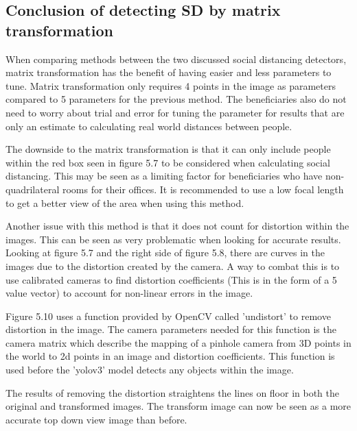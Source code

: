 \documentclass[12pt]{report}
\begin{document}
\subsection{Conclusion of detecting SD by matrix transformation}

When comparing methods between the two discussed social distancing detectors, matrix transformation has the benefit of having easier and less parameters to tune. Matrix transformation only requires 4 points in the image as parameters compared to 5 parameters for the previous method. The beneficiaries also do not need to worry about trial and error for tuning the parameter for results that are only an estimate to calculating real world distances between people.

\vspace{2mm}

The downside to the matrix transformation is that it can only include people within the red box seen in figure 5.7 to be considered when calculating social distancing. This may be seen as a limiting factor for beneficiaries who have non-quadrilateral rooms for their offices. It is recommended to use a low focal length to get a better view of the area when using this method.

\vspace{2mm}

Another issue with this method is that it does not count for distortion within the images. This can be seen as very problematic when looking for accurate results. Looking at figure 5.7 and the right side of figure 5.8, there are curves in the images due to the distortion created by the camera. A way to combat this is to use calibrated cameras to find distortion coefficients (This is in the form of a 5 value vector) to account for non-linear errors in the image.

\vspace{2mm}

Figure 5.10 uses a function provided by OpenCV called 'undistort' to remove distortion in the image. The camera parameters needed for this function is the camera matrix which describe the mapping of a pinhole camera from 3D points in the world to 2d points in an image and distortion coefficients. This function is used before the 'yolov3' model detects any objects within the image.

\vspace{2mm}

The results of removing the distortion straightens the lines on floor in both the original and transformed images. The transform image can now be seen as a more accurate top down view image than before.
\end{document}
